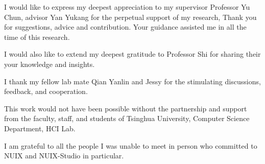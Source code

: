 \begin{acknowledgements}

  I would like to express my deepest appreciation to my supervisor Professor Yu Chun, advisor Yan Yukang for the perpetual support of my research, Thank you for suggestions, advice and contribution. Your guidance assisted me in all the time of this research.
  
  I would also like to extend my deepest gratitude to Professor Shi for sharing their your knowledge and insights. 
  
  I thank my fellow lab mate Qian Yanlin and Jessy for the stimulating discussions, feedback, and cooperation.
  
  This work would not have been possible without the partnership and support from the faculty, staff, and students of Tsinghua University, Computer Science Department, HCI Lab. 
  
  I am grateful to all the people I was unable to meet in person who committed to NUIX and NUIX-Studio in particular.
  
\end{acknowledgements}
